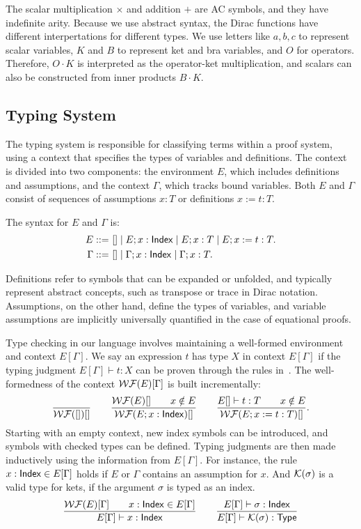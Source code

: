 The scalar multiplication $\times$ and addition $+$ are AC symbols, and they have indefinite arity. 
Because we use abstract syntax, the Dirac functions have different interpertations for different types. 
We use letters like $a, b, c$ to represent scalar variables, $K$ and $B$ to represent ket and bra variables, and $O$ for operators.
Therefore, $O \cdot K$ is interpreted as the operator-ket multiplication, and scalars can also be constructed from inner products $B \cdot K$.


\subsection{Typing System}


The typing system is responsible for classifying terms within a proof system, using a context that specifies the types of variables and definitions. The context is divided into two components: the environment \( E \), which includes definitions and assumptions, and the context \( \Gamma \), which tracks bound variables. Both \( E \) and \( \Gamma \) consist of sequences of assumptions \( x : T \) or definitions \( x := t : T \).
\begin{definition}
    The syntax for \( E \) and \( \Gamma \) is:
    \begin{align*}
        E ::= &\ [] \mid E; x : \mathsf{Index} \mid E; x : T \mid E; x := t : T. \\
        \Gamma ::= &\ [] \mid \Gamma; x : \mathsf{Index} \mid \Gamma; x : T.
    \end{align*}
\end{definition}
Definitions refer to symbols that can be expanded or unfolded, and typically represent abstract concepts, such as transpose or trace in Dirac notation. Assumptions, on the other hand, define the types of variables, and variable assumptions are implicitly universally quantified in the case of equational proofs.

Type checking in our language involves maintaining a well-formed environment and context \( E[\Gamma] \). We say an expression \( t \) has type \( X \) in context \( E[\Gamma] \) if the typing judgment \( E[\Gamma] \vdash t : X \) can be proven through the rules in~. The well-formedness of the context \( \mathcal{WF}(E)[\Gamma] \) is built incrementally:
\[
    \frac{}{\mathcal{WF}([])[]}
    \qquad
    \frac{\mathcal{WF}(E)[] \qquad x \notin E}{\mathcal{WF}(E; x : \mathsf{Index})[]}
    \qquad
    \frac{E[]\vdash t:T \qquad x \notin E}{\mathcal{WF}(E; x := t:T)[]}.
\]
Starting with an empty context, new index symbols can be introduced, and symbols with checked types can be defined. Typing judgments are then made inductively using the information from \( E[\Gamma] \). For instance, the rule \( x : \mathsf{Index} \in E[\Gamma] \) holds if \( E \) or \( \Gamma \) contains an assumption for \( x \).
And \(\mathcal{K}(\sigma)\) is a valid type for kets, if the argument $\sigma$ is typed as an index.
\begin{gather*}
    \frac{\mathcal{WF}(E)[\Gamma] \qquad x : \mathsf{Index} \in E[\Gamma]}{E[\Gamma] \vdash x : \mathsf{Index}}
    \qquad
    \frac{E[\Gamma] \vdash \sigma : \mathsf{Index}}{E[\Gamma] \vdash \mathcal{K}(\sigma) : \mathsf{Type}}
\end{gather*}

